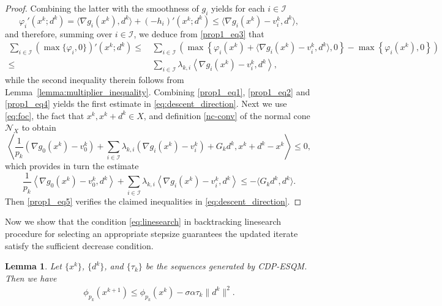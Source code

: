 \documentclass[11pt,a4paper]{article}
\newtheorem{lemma}[theorem]{Lemma}
\theoremstyle{plain}
\begin{document}
\begin{proof}
Combining the latter with the smoothness of {$g_i$} yields for each $i \in \mathcal I$
 \begin{equation*}
   \varphi_i'(x^k; d^k) = \langle \nabla {g_i}(x^k), d^k \rangle + (-h_i)'(x^k; d^k) \le \langle \nabla g_i(x^k) - v_i^k, d^k \rangle,
 \end{equation*}
and therefore, summing over $i\in\mathcal I$, we deduce from \eqref{prop1_eq3} that
\begin{equation}\label{prop1_eq4}
 \begin{aligned}
   \sum_{i\in\mathcal I} \left(\max\{\varphi_i, 0\}\right)'\left(x^k; d^k\right) \leq\, &\sum_{i\in\mathcal I} \left( \max\left\{ \varphi_i(x^k) + \langle \nabla g_i(x^k) - v_i^k, d^k \rangle, 0 \right\} 
   - \max\left\{ \varphi_i(x^k), 0 \right\} \right) \\
   \le \, & \sum_{i\in\mathcal I} \lambda_{k,i} \left\langle \nabla g_i(x^k) - v_i^k, d^k \right\rangle,
 \end{aligned}
\end{equation}
while the second inequality therein follows from Lemma~\ref{lemma:multiplier_inequality}. Combining \eqref{prop1_eq1}, \eqref{prop1_eq2} and \eqref{prop1_eq4} yields the first estimate in \eqref{eq:descent_direction}. Next we use \eqref{eq:foc}, 
the fact that $x^k, x^k + d^k \in X$, and definition \eqref{nc-conv} of the normal cone $\mathcal{N}_X$ to obtain
\begin{equation*}
\left\langle \frac{1}{p_k}\left(\nabla g_0(x^k)-v_0^k\right) + \sum_{i\in\mathcal I} \lambda_{k,i} \left(\nabla g_i(x^k)-v_i^k\right) + G_kd^k, x^k + d^k - x^k \right \rangle \le 0,
\end{equation*}
which provides in turn the estimate
\begin{equation}\label{prop1_eq5}
\frac{1}{p_k}\left\langle\nabla g_0(x^k)-v_0^k, d^k\right\rangle + \sum_{i\in\mathcal I} \lambda_{k,i} \left\langle\nabla g_i(x^k)-v_i^k, d^k\right\rangle \le -\langle G_kd^k,d^k \rangle.
\end{equation}
Then \eqref{prop1_eq5} verifies the claimed inequalities in \eqref{eq:descent_direction}.
\end{proof}\vspace*{0.05in}



{
Now we show that the condition \eqref{eq:linesearch} in backtracking linesearch procedure for selecting an appropriate stepsize guarantees the updated iterate satisfy the sufficient decrease condition.
\begin{lemma}\label{lemma:sufficient_decrease}
Let $\{x^k\}$, $\{d^k\}$, and $\{\tau_k\}$ be the sequences generated by CDP-ESQM. Then we have
\begin{equation}\label{lem36_eq}
    \begin{aligned}
        \phi_{p_k}(x^{k+1})\leq\phi_{p_k}(x^k)-\sigma\alpha\tau_k\|d^k\|^2.
    \end{aligned}
\end{equation}
\end{lemma}}
\end{document}
